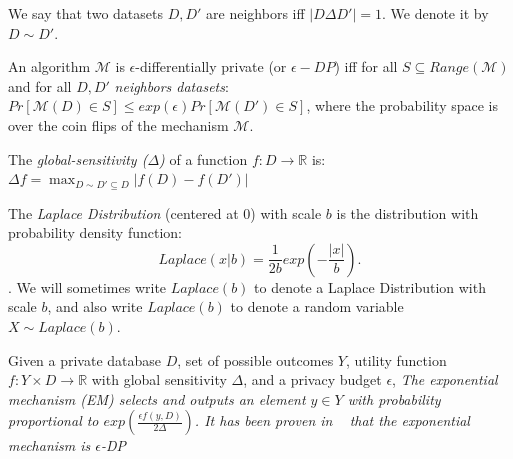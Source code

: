 \begin{definition}
    We say that two datasets $D, D'$ are neighbors iff $|D \Delta D'| = 1$. We denote it by $D\sim D'$.
\end{definition}
\begin{definition}
    An algorithm $\mathcal{M}$ is $\epsilon$-differentially private (or $\epsilon-DP$) iff for all $S \subseteq Range(\mathcal{M})$ and for all $D, D'$ {\it neighbors datasets}: $Pr[\mathcal{M}(D)\in S] \leq exp(\epsilon)Pr[\mathcal{M}(D')\in S]$, where the probability space is over the coin flips of the mechanism $\mathcal{M}$. 
\end{definition}
\begin{definition}
    The {\it global-sensitivity ($\Delta$)} of a function $f:D\rightarrow \mathbb{R}$ is:\\ 
    $\Delta f = \max_{D\sim D'\subseteq D} |f(D) - f(D')|$
\end{definition}
\begin{definition}
    The {\it Laplace Distribution} (centered at 0) with scale $b$ is the distribution with probability density function:
    \[
    Laplace(x|b) = \frac{1}{2b} exp (- \frac{|x|}{b}).
    \].
    We will sometimes write $Laplace(b)$ to denote a Laplace Distribution with scale $b$, and also write $Laplace(b)$ to denote a random variable $X \sim Laplace(b)$.
\end{definition}

\begin{definition}
Given a private database $D$, set of possible outcomes $Y$, utility function $f: Y\times D \rightarrow \mathbb{R}$  with global sensitivity $\Delta$, and a privacy budget $\epsilon$,
\it{The exponential mechanism (EM)} selects and outputs an element $y\in Y$ with probability proportional to $exp({\frac{\epsilon f(y,D)}{2\Delta}})$.
It has been proven in ~\cite{TheAlgFoundDP2014} that \it{the exponential mechanism is $\epsilon$-DP}
\end{definition}



